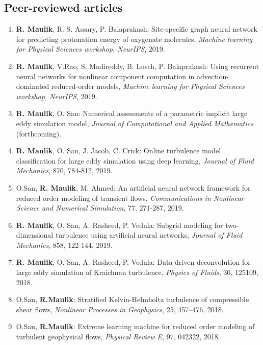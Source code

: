 \documentclass[letterpaper]{article}
\begin{document}
\subsection*{Peer-reviewed articles}

\begin{enumerate}

\item \textbf{R. Maulik}, R. S. Assary, P. Balaprakash: Site-specific graph neural network for predicting protonation energy of oxygenate molecules, {\it Machine learning for Physical Sciences workshop, NeurIPS}, 2019.

\item \textbf{R. Maulik}, V.Rao, S. Madireddy, B. Lusch, P. Balaprakash: Using recurrent neural networks for nonlinear component computation in advection-dominated reduced-order models, \textit{Machine learning for Physical Sciences workshop, NeurIPS}, 2019.

\item \textbf{R. Maulik}, O. San: Numerical assessments of a parametric implicit large eddy simulation model, {\it Journal of Computational and Applied Mathematics} (forthcoming).

\item \textbf{R. Maulik}, O. San, J. Jacob, C. Crick: Online turbulence model classification for large eddy simulation using deep learning, {\it Journal of Fluid Mechanics}, 870, 784-812, 2019.

\item O.San, \textbf{R. Maulik}, M. Ahmed: An artificial neural network framework for reduced order modeling of transient flows, {\it Communications in Nonlinear Science and Numerical Simulation}, 77, 271-287, 2019.

\item \textbf{R. Maulik}, O. San, A. Rasheed, P. Vedula: Subgrid modeling for two-dimensional turbulence using artificial neural networks, {\it Journal of Fluid Mechanics}, 858, 122-144, 2019.

\item \textbf{R. Maulik}, O. San, A. Rasheed, P. Vedula: Data-driven deconvolution for large eddy simulation of Kraichnan turbulence, {\it Physics of Fluids}, 30, 125109, 2018.

\item O.San, \textbf{R.Maulik}: Stratified Kelvin-Helmholtz turbulence of compressible shear flows, {\it Nonlinear Processes in Geophysics}, 25, 457--476, 2018.
 
\item O.San, \textbf{R.Maulik}: Extreme learning machine for reduced order modeling of turbulent geophysical flows, {\it Physical Review E}, 97, 042322, 2018.


\end{enumerate}
\end{document}
